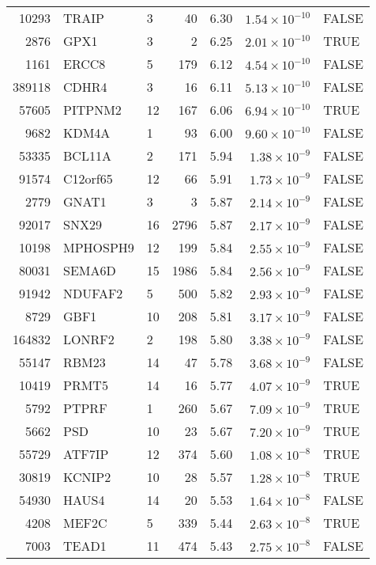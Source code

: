 \begin{table}[ht]
\begin{adjustbox}{totalheight=10in}
\begin{tabular}{rllrrrl}
  10293 & TRAIP & 3 &  40 & 6.30 & $1.54 \times 10^{-10}$ & FALSE \\ 
  2876 & GPX1 & 3 &   2 & 6.25 & $2.01 \times 10^{-10}$ & TRUE \\ 
  1161 & ERCC8 & 5 & 179 & 6.12 & $4.54 \times 10^{-10}$ & FALSE \\ 
  389118 & CDHR4 & 3 &  16 & 6.11 & $5.13 \times 10^{-10}$ & FALSE \\ 
  57605 & PITPNM2 & 12 & 167 & 6.06 & $6.94 \times 10^{-10}$ & TRUE \\ 
  9682 & KDM4A & 1 &  93 & 6.00 & $9.60 \times 10^{-10}$ & FALSE \\ 
  53335 & BCL11A & 2 & 171 & 5.94 & $1.38 \times 10^{-9}$ & FALSE \\ 
  91574 & C12orf65 & 12 &  66 & 5.91 & $1.73 \times 10^{-9}$ & FALSE \\ 
  2779 & GNAT1 & 3 &   3 & 5.87 & $2.14 \times 10^{-9}$ & FALSE \\ 
  92017 & SNX29 & 16 & 2796 & 5.87 & $2.17 \times 10^{-9}$ & FALSE \\ 
  10198 & MPHOSPH9 & 12 & 199 & 5.84 & $2.55 \times 10^{-9}$ & FALSE \\ 
  80031 & SEMA6D & 15 & 1986 & 5.84 & $2.56 \times 10^{-9}$ & FALSE \\ 
  91942 & NDUFAF2 & 5 & 500 & 5.82 & $2.93 \times 10^{-9}$ & FALSE \\ 
  8729 & GBF1 & 10 & 208 & 5.81 & $3.17 \times 10^{-9}$ & FALSE \\ 
  164832 & LONRF2 & 2 & 198 & 5.80 & $3.38 \times 10^{-9}$ & FALSE \\ 
  55147 & RBM23 & 14 &  47 & 5.78 & $3.68 \times 10^{-9}$ & FALSE \\ 
  10419 & PRMT5 & 14 &  16 & 5.77 & $4.07 \times 10^{-9}$ & TRUE \\ 
  5792 & PTPRF & 1 & 260 & 5.67 & $7.09 \times 10^{-9}$ & TRUE \\ 
  5662 & PSD & 10 &  23 & 5.67 & $7.20 \times 10^{-9}$ & TRUE \\ 
  55729 & ATF7IP & 12 & 374 & 5.60 & $1.08 \times 10^{-8}$ & TRUE \\ 
  30819 & KCNIP2 & 10 &  28 & 5.57 & $1.28 \times 10^{-8}$ & TRUE \\ 
  54930 & HAUS4 & 14 &  20 & 5.53 & $1.64 \times 10^{-8}$ & FALSE \\ 
  4208 & MEF2C & 5 & 339 & 5.44 & $2.63 \times 10^{-8}$ & TRUE \\ 
  7003 & TEAD1 & 11 & 474 & 5.43 & $2.75 \times 10^{-8}$ & FALSE \\ 

\end{tabular}
\end{adjustbox}
\end{table}
